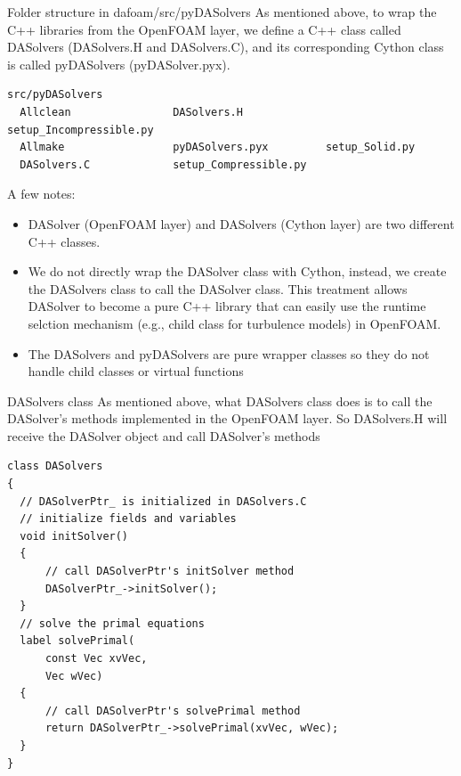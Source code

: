 \documentclass{bredelebeamer}
\begin{document}
\begin{frame}[fragile]{Folder structure in dafoam/src/pyDASolvers}
As mentioned above, to wrap the C++ libraries from the OpenFOAM layer, we define a C++ class called DASolvers (DASolvers.H and DASolvers.C), and its corresponding Cython class is called pyDASolvers (pyDASolver.pyx).
\footnotesize
\lstset{ language=bash }
\begin{lstlisting}
src/pyDASolvers
  Allclean                DASolvers.H             setup_Incompressible.py
  Allmake                 pyDASolvers.pyx         setup_Solid.py
  DASolvers.C             setup_Compressible.py
\end{lstlisting}
\normalsize

A few notes:

\begin{itemize}
  \setlength\itemsep{0.5em}
 \item DASolver (OpenFOAM layer) and DASolvers (Cython layer) are two different C++ classes.
 \item We do not directly wrap the DASolver class with Cython, instead, we create the DASolvers class to call the DASolver class. This treatment allows DASolver to become a pure C++ library that can easily use the runtime selction mechanism (e.g., child class for turbulence models) in OpenFOAM.
 \item The DASolvers and pyDASolvers are pure wrapper classes so they do not handle child classes or virtual functions
\end{itemize}

\end{frame}

\begin{frame}[fragile]{DASolvers class}
 As mentioned above, what DASolvers class does is to call the DASolver's methods implemented in the OpenFOAM layer. So DASolvers.H will receive the DASolver object and call DASolver's methods
\footnotesize
\lstset{ language=c++ }
\begin{lstlisting}
class DASolvers
{
  // DASolverPtr_ is initialized in DASolvers.C
  // initialize fields and variables
  void initSolver()
  {
      // call DASolverPtr's initSolver method
      DASolverPtr_->initSolver();
  }
  // solve the primal equations
  label solvePrimal(
      const Vec xvVec,
      Vec wVec)
  {
      // call DASolverPtr's solvePrimal method
      return DASolverPtr_->solvePrimal(xvVec, wVec);
  }
}
\end{lstlisting}
\normalsize
\end{frame}
\end{document}
